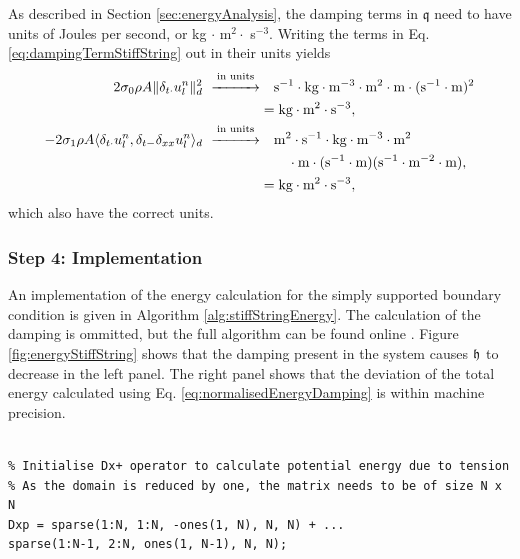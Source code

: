 {As described in Section \ref{sec:energyAnalysis}, the damping terms in $\mathfrak{q}$ need to have units of Joules per second, or kg $\cdot$ m$^2 \cdot$ s$^{-3}$. Writing the terms in Eq. \eqref{eq:dampingTermStiffString} out in their units yields
\begin{align*}
    2\sigma_{0} \rho A \lVert\delta_{t\cdot}u_l^n\rVert_d^2\ \overset{\text{in units}}{\xrightarrow{\hspace*{1cm}}}&\quad \text{s}^{-1}\cdot\text{kg}\cdot\text{m}^{-3}\cdot\text{m}^2\cdot \text{m}\cdot(\text{s}^{-1}\cdot\text{m})^2 \\
    &= \text{kg} \cdot \text{m}^2 \cdot \text{s}^{-3},\\
    - 2 \sigma_{1} \rho A \langle \delta_{t\cdot} u_l^n, \delta_{t-} \delta_{xx} u_l^n \rangle_d\  \overset{\text{in units}}{\xrightarrow{\hspace*{1cm}}}&\quad \text{m}^2\cdot\text{s}^{-1}\cdot\text{kg}\cdot\text{m}^{-3}\cdot\text{m}^2\\
    &\qquad\cdot\text{m}\cdot(\text{s}^{-1}\cdot\text{m})(\text{s}^{-1}\cdot\text{m}^{-2}\cdot \text{m}),\\
    &= \text{kg} \cdot \text{m}^2 \cdot \text{s}^{-3},
\end{align*}
which also have the correct units.
\subsubsection{Step 4: Implementation}
An implementation of the energy calculation for the simply supported boundary condition is given in Algorithm \ref{alg:stiffStringEnergy}. The calculation of the damping is ommitted, but the full algorithm can be found online \cite{stringGist}. Figure \ref{fig:energyStiffString} shows that the damping present in the system causes $\mathfrak{h}$ to decrease in the left panel. The right panel shows that the deviation of the total energy calculated using Eq. \eqref{eq:normalisedEnergyDamping} is within machine precision.
\\
\noindent
\begin{minipage}{\textwidth}
\setlstMAT
\begin{lstlisting}[caption=Calculating $\h$ for the simply supported boundary condition., label=alg:stiffStringEnergy]
%%%% Before the main loop: %%%%

% Initialise Dx+ operator to calculate potential energy due to tension
% As the domain is reduced by one, the matrix needs to be of size N x N
Dxp = sparse(1:N, 1:N, -ones(1, N), N, N) + ...
sparse(1:N-1, 2:N, ones(1, N-1), N, N);


\end{lstlisting}
\end{minipage}}
